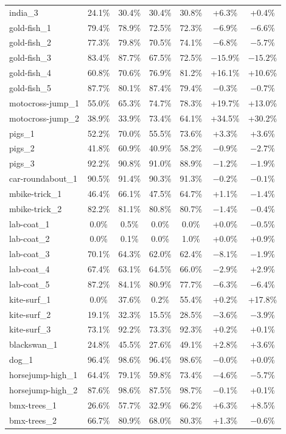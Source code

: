 \documentclass[journal,12pt,onecolumn,draftclsnofoot]{IEEEtran}
\begin{document}
\begin{longtable}{l c c c c c c}
india\_3 & 24.1\% & 30.4\% & 30.4\% & 30.8\% & +6.3\% & +0.4\% \\
gold-fish\_1 & 79.4\% & 78.9\% & 72.5\% & 72.3\% & $-6.9\%$ & $-6.6\%$ \\
gold-fish\_2 & 77.3\% & 79.8\% & 70.5\% & 74.1\% & $-6.8\%$ & $-5.7\%$ \\
gold-fish\_3 & 83.4\% & 87.7\% & 67.5\% & 72.5\% & $-15.9\%$ & $-15.2\%$ \\
gold-fish\_4 & 60.8\% & 70.6\% & 76.9\% & 81.2\% & +16.1\% & +10.6\% \\
gold-fish\_5 & 87.7\% & 80.1\% & 87.4\% & 79.4\% & $-0.3\%$ & $-0.7\%$ \\
motocross-jump\_1 & 55.0\% & 65.3\% & 74.7\% & 78.3\% & +19.7\% & +13.0\% \\
motocross-jump\_2 & 38.9\% & 33.9\% & 73.4\% & 64.1\% & +34.5\% & +30.2\% \\
pigs\_1 & 52.2\% & 70.0\% & 55.5\% & 73.6\% & +3.3\% & +3.6\% \\
pigs\_2 & 41.8\% & 60.9\% & 40.9\% & 58.2\% & $-0.9\%$ & $-2.7\%$ \\
pigs\_3 & 92.2\% & 90.8\% & 91.0\% & 88.9\% & $-1.2\%$ & $-1.9\%$ \\
car-roundabout\_1 & 90.5\% & 91.4\% & 90.3\% & 91.3\% & $-0.2\%$ & $-0.1\%$ \\
mbike-trick\_1 & 46.4\% & 66.1\% & 47.5\% & 64.7\% & +1.1\% & $-1.4\%$ \\
mbike-trick\_2 & 82.2\% & 81.1\% & 80.8\% & 80.7\% & $-1.4\%$ & $-0.4\%$ \\
lab-coat\_1 & 0.0\% & 0.5\% & 0.0\% & 0.0\% & +0.0\% & $-0.5\%$ \\
lab-coat\_2 & 0.0\% & 0.1\% & 0.0\% & 1.0\% & +0.0\% & +0.9\% \\
lab-coat\_3 & 70.1\% & 64.3\% & 62.0\% & 62.4\% & $-8.1\%$ & $-1.9\%$ \\
lab-coat\_4 & 67.4\% & 63.1\% & 64.5\% & 66.0\% & $-2.9\%$ & +2.9\% \\
lab-coat\_5 & 87.2\% & 84.1\% & 80.9\% & 77.7\% & $-6.3\%$ & $-6.4\%$ \\
kite-surf\_1 & 0.0\% & 37.6\% & 0.2\% & 55.4\% & +0.2\% & +17.8\% \\
kite-surf\_2 & 19.1\% & 32.3\% & 15.5\% & 28.5\% & $-3.6\%$ & $-3.9\%$ \\
kite-surf\_3 & 73.1\% & 92.2\% & 73.3\% & 92.3\% & +0.2\% & +0.1\% \\
blackswan\_1 & 24.8\% & 45.5\% & 27.6\% & 49.1\% & +2.8\% & +3.6\% \\
dog\_1 & 96.4\% & 98.6\% & 96.4\% & 98.6\% & $-0.0\%$ & +0.0\% \\
horsejump-high\_1 & 64.4\% & 79.1\% & 59.8\% & 73.4\% & $-4.6\%$ & $-5.7\%$ \\
horsejump-high\_2 & 87.6\% & 98.6\% & 87.5\% & 98.7\% & $-0.1\%$ & +0.1\% \\
bmx-trees\_1 & 26.6\% & 57.7\% & 32.9\% & 66.2\% & +6.3\% & +8.5\% \\
bmx-trees\_2 & 66.7\% & 80.9\% & 68.0\% & 80.3\% & +1.3\% & $-0.6\%$ \\
\end{longtable}
\normalsize
\end{document}
